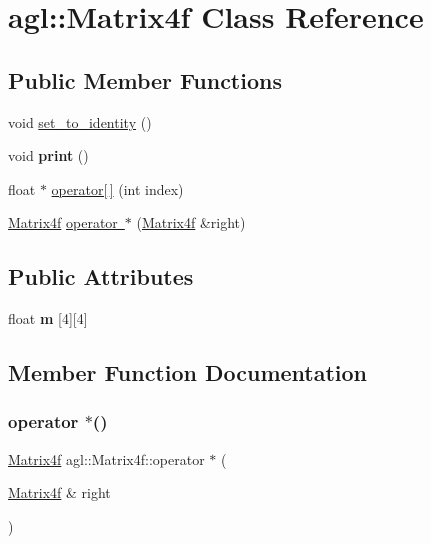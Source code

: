 \hypertarget{classagl_1_1Matrix4f}{}\section{agl\+::Matrix4f Class Reference}
\label{classagl_1_1Matrix4f}
\subsection*{Public Member Functions}
\begin{DoxyCompactItemize}
\item 
void \mbox{\hyperlink{classagl_1_1Matrix4f_a51973ba1ec474b3c0cfd64d93691f04a}{set\+\_\+to\+\_\+identity}} ()
\item 
\mbox{\label{classagl_1_1Matrix4f_aa3db44a6fd68030993d343f7fbe9e7e7}} 
void {\bfseries print} ()
\item 
float $\ast$ \mbox{\hyperlink{classagl_1_1Matrix4f_acdb789b7069e850da3ae52e57155d0e0}{operator\mbox{[}$\,$\mbox{]}}} (int index)
\item 
\mbox{\hyperlink{classagl_1_1Matrix4f}{Matrix4f}} \mbox{\hyperlink{classagl_1_1Matrix4f_a1d22d0236f385f89c0dfa6fa6a6ee51f}{operator $\ast$}} (\mbox{\hyperlink{classagl_1_1Matrix4f}{Matrix4f}} \&right)
\end{DoxyCompactItemize}
\subsection*{Public Attributes}
\begin{DoxyCompactItemize}
\item 
\mbox{\label{classagl_1_1Matrix4f_a65bb7f4fada025b2eb1aaba0f173a68b}} 
float {\bfseries m} \mbox{[}4\mbox{]}\mbox{[}4\mbox{]}
\end{DoxyCompactItemize}


\subsection{Member Function Documentation}
\mbox{\label{classagl_1_1Matrix4f_a1d22d0236f385f89c0dfa6fa6a6ee51f}} 
\subsubsection{\texorpdfstring{operator $\ast$()}{operator *()}}
{\footnotesize\ttfamily \mbox{\hyperlink{classagl_1_1Matrix4f}{Matrix4f}} agl\+::\+Matrix4f\+::operator $\ast$ (\begin{DoxyParamCaption}\item[{\mbox{\hyperlink{classagl_1_1Matrix4f}{Matrix4f}} \&}]{right }\end{DoxyParamCaption})}

